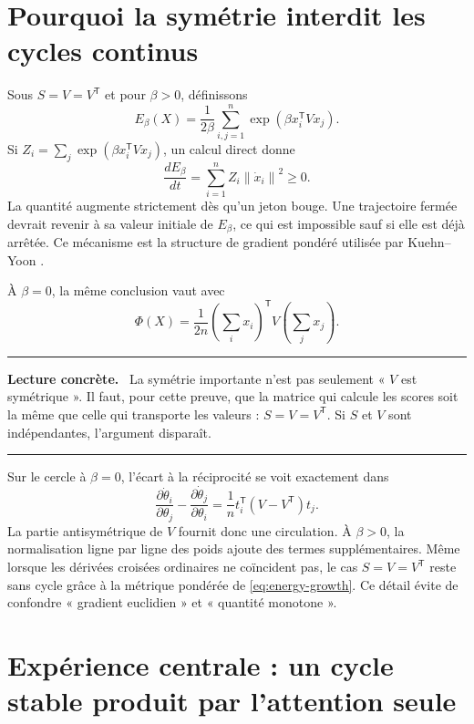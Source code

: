 \documentclass[11pt,a4paper]{article}
\theoremstyle{definition}
\newcommand{\T}{\mathsf T}
\newcommand{\norm}[1]{\left\lVert #1\right\rVert}
\newenvironment{plainbox}
{\begin{center}\begin{minipage}{0.92\textwidth}\color{deepblue}\hrule\vspace{0.45em}\small\textbf{Lecture concrète.}\ \color{black}}
{\vspace{0.35em}\color{deepblue}\hrule\color{black}\end{minipage}\end{center}}
\begin{document}
\section{Pourquoi la symétrie interdit les cycles continus}
\label{sec:no-cycle}

Sous $S=V=V^{\T}$ et pour $\beta>0$, définissons
\begin{equation}
 E_\beta(X)=\frac{1}{2\beta}\sum_{i,j=1}^n
 \exp\!\left(\beta x_i^{\T}Vx_j\right).                   \label{eq:energy}
\end{equation}
Si $Z_i=\sum_j\exp(\beta x_i^{\T}Vx_j)$, un calcul direct donne
\begin{equation}
 \frac{dE_\beta}{dt}=\sum_{i=1}^n Z_i\norm{\dot x_i}^2\geq0.  \label{eq:energy-growth}
\end{equation}
La quantité augmente strictement dès qu'un jeton bouge. Une trajectoire fermée devrait
revenir à sa valeur initiale de $E_\beta$, ce qui est impossible sauf si elle est déjà
arrêtée. Ce mécanisme est la structure de gradient pondéré utilisée par
Kuehn--Yoon \cite{kuehnyoon2026spectral}.

À $\beta=0$, la même conclusion vaut avec
\[
 \Phi(X)=\frac{1}{2n}\left(\sum_i x_i\right)^{\T}
 V\left(\sum_jx_j\right).
\]

\begin{plainbox}
La symétrie importante n'est pas seulement « $V$ est symétrique ». Il faut, pour cette
preuve, que la matrice qui calcule les scores soit la même que celle qui transporte les
valeurs : $S=V=V^{\T}$. Si $S$ et $V$ sont indépendantes, l'argument disparaît.
\end{plainbox}

Sur le cercle à $\beta=0$, l'écart à la réciprocité se voit exactement dans
\begin{equation}
 \frac{\partial\dot\theta_i}{\partial\theta_j}
 -\frac{\partial\dot\theta_j}{\partial\theta_i}
 =\frac1n t_i^{\T}(V-V^{\T})t_j.                          \label{eq:curl}
\end{equation}
La partie antisymétrique de $V$ fournit donc une circulation. À $\beta>0$, la
normalisation ligne par ligne des poids ajoute des termes supplémentaires. Même lorsque
les dérivées croisées ordinaires ne coïncident pas, le cas $S=V=V^{\T}$ reste sans cycle
grâce à la métrique pondérée de \eqref{eq:energy-growth}. Ce détail évite de confondre
« gradient euclidien » et « quantité monotone ».

\section{Expérience centrale : un cycle stable produit par l'attention seule}
\label{sec:cycle-experiment}
\end{document}
